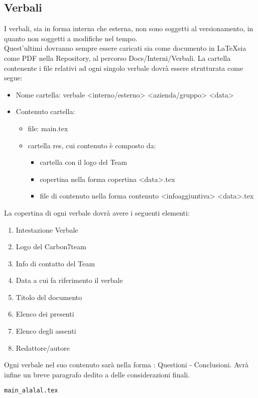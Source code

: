 \subsection{Verbali}
I verbali, sia in forma interna che esterna, non sono soggetti al versionamento, in quanto non soggetti a modifiche nel tempo.\\ 
Quest'ultimi dovranno sempre essere caricati sia come documento in \LaTeX sia come PDF nella Repository, al percorso Docs/Interni/Verbali.
La cartella contenente i file relativi ad ogni singolo verbale dovrà essere strutturata come segue:\\
\begin{itemize}
    \item Nome cartella: verbale  <interno/esterno>  <azienda/gruppo>  <data>\\
    \item Contenuto cartella:\\
    \begin{itemize}
        \item file: main.tex
        \item cartella res, cui contenuto è composto da:
        \begin{itemize}
            \item cartella con il logo del Team
            \item copertina nella forma copertina <data>.tex
            \item file di contenuto nella forma contenuto <infoaggiuntiva> <data>.tex
        \end{itemize}
    \end{itemize}
\end{itemize}

La copertina di ogni verbale dovrà avere i seguenti elementi:\\
\begin{enumerate}
    \item Intestazione Verbale
    \item Logo del Carbon7team
    \item Info di contatto del Team
    \item Data a cui fa riferimento il verbale
    \item Titolo del documento
    \item Elenco dei presenti
    \item Elenco degli assenti
    \item Redattore/autore
\end{enumerate}

Ogni verbale nel suo contenuto sarà nella forma : Questioni - Conclusioni.
Avrà infine un breve paragrafo dedito a delle considerazioni finali.



\begin{lstlisting}
main_alalal.tex
\end{lstlisting}